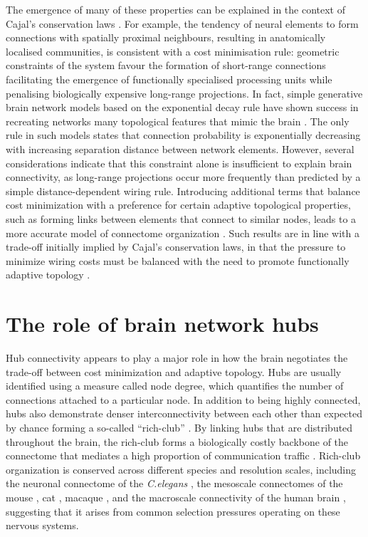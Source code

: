 The emergence of many of these properties can be explained in the context of Cajal's conservation laws \citep{RamonyCajal1995}. For example, the tendency of neural elements to form connections with spatially proximal neighbours, resulting in anatomically localised communities, is consistent with a cost minimisation rule: geometric constraints of the system favour the formation of short-range connections facilitating the emergence of functionally specialised processing units while penalising biologically expensive long-range projections. In fact, simple generative brain network models based on the exponential decay rule have shown success in recreating networks many topological features that mimic the brain \citep{Ercsey-Ravasz2013,Henderson2014}. The only rule in such models states that connection probability is exponentially decreasing with increasing separation distance between network elements. However, several considerations indicate that this constraint alone is insufficient to explain brain connectivity, as long-range projections occur more frequently than predicted by a simple distance-dependent wiring rule. Introducing additional terms that balance cost minimization with a preference for certain adaptive topological properties, such as forming links between elements that connect to similar nodes, leads to a more accurate model of connectome organization \citep{Betzel2016,Vertes2012}. Such results are in line with a trade-off initially implied by Cajal's conservation laws, in that the pressure to minimize wiring costs must be balanced with the need to promote functionally adaptive topology \citep{Bullmore2012}.

\section{The role of brain network hubs}

Hub connectivity appears to play a major role in how the brain negotiates the trade-off between cost minimization and adaptive topology. Hubs are usually identified using a measure called node degree, which quantifies the number of connections attached to a particular node. In addition to being highly connected, hubs also demonstrate denser interconnectivity between each other than expected by chance forming a so-called ``rich-club'' \citep{Fulcher2016,Harriger2012,Towlson2013,VandenHeuvel2011,Zamora-Lopez2010}. By linking hubs that are distributed throughout the brain, the rich-club forms a biologically costly backbone of the connectome that mediates a high proportion of communication traffic \citep{VandenHeuvel2012}. Rich-club organization is conserved across different species and resolution scales, including the neuronal connectome of the \textit{C.elegans} \citep{Towlson2013}, the mesoscale connectomes of the mouse \citep{Oh2014,Fulcher2016}, cat \citep{DeReus2013b}, macaque \citep{Harriger2012}, and the macroscale connectivity of the human brain \citep{VandenHeuvel2011}, suggesting that it arises from common selection pressures operating on these nervous systems.

